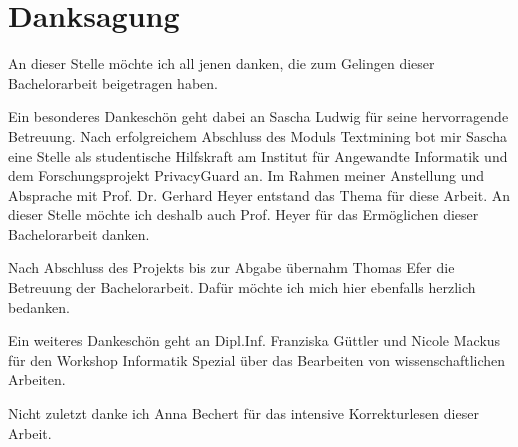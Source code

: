 \documentclass[11pt, a4paper, twoside, openright, final]{book}
\makeatletter
\numberwithin{equation}{chapter}		%
\renewcommand*{\cleardoublepage}{\clearpage\if@twoside \ifodd\c@page\else
\hbox{}%
\thispagestyle{empty}%
\newpage%
\if@twocolumn\hbox{}\newpage\fi\fi\fi}
\newcommand{\1}{\mathbbm{1}}
\makeatother
\begin{document}



\tableofcontents
\cleardoublepage


\setcounter{page}{1}	%










\cleardoublepage
\chapter*{Danksagung}
\label{c:acknowledgement}

An dieser Stelle möchte ich all jenen danken, die zum Gelingen dieser Bachelorarbeit beigetragen haben.

Ein besonderes Dankeschön geht dabei an Sascha Ludwig für seine hervorragende Betreuung. Nach erfolgreichem Abschluss des Moduls \glqq Textmining \grqq{} bot mir Sascha eine Stelle als studentische Hilfskraft am Institut für Angewandte Informatik und dem Forschungsprojekt \glqq PrivacyGuard \grqq{} an. Im Rahmen meiner Anstellung und Absprache mit Prof. Dr. Gerhard Heyer entstand das Thema für diese Arbeit. An dieser Stelle möchte ich deshalb auch Prof. Heyer für das Ermöglichen dieser Bachelorarbeit danken.

Nach Abschluss des Projekts bis zur Abgabe übernahm Thomas Efer die Betreuung der Bachelorarbeit. Dafür möchte ich mich hier ebenfalls herzlich bedanken.

Ein weiteres Dankeschön geht an Dipl.Inf. Franziska Güttler und Nicole Mackus für den Workshop \glqq Informatik Spezial\grqq{} über das Bearbeiten von wissenschaftlichen Arbeiten.

Nicht zuletzt danke ich Anna Bechert für das intensive Korrekturlesen dieser Arbeit.



\listoffigures
\end{document}
